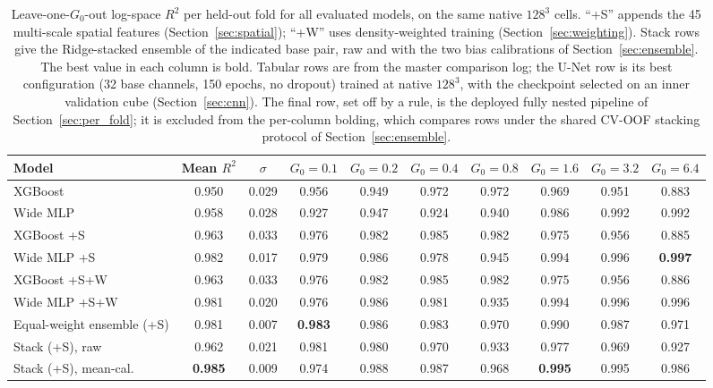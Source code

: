 \documentclass[fleqn,usenatbib]{rasti}
\newcommand{\Gzero}{G_0}
\newcommand{\Rsq}{R^2}
\begin{document}
\begin{table}
\centering
\caption{Leave-one-\(\Gzero\)-out log-space \(\Rsq\) per held-out fold for
all evaluated models, on the same native \(128^3\) cells. ``+S'' appends
the 45 multi-scale spatial features (Section~\ref{sec:spatial}); ``+W''
uses density-weighted training (Section~\ref{sec:weighting}). Stack
rows give the Ridge-stacked ensemble of the indicated base pair, raw and
with the two bias calibrations of Section~\ref{sec:ensemble}. The
best value in each column is bold. Tabular rows are from the master
comparison log; the U-Net row is its best configuration (32 base
channels, 150 epochs, no dropout) trained at native \(128^3\), with the
checkpoint selected on an inner validation cube
(Section~\ref{sec:cnn}). The final
row, set off by a rule, is the deployed fully nested pipeline of
Section~\ref{sec:per_fold}; it is excluded from the per-column
bolding, which compares rows under the shared CV-OOF stacking protocol
of Section~\ref{sec:ensemble}.}
\label{tab:main}
\begin{tabular}{lccccccccc}
\hline
Model & Mean \(\Rsq\) & \(\sigma\) &
  \(\Gzero{=}0.1\) & \(\Gzero{=}0.2\) & \(\Gzero{=}0.4\) &
  \(\Gzero{=}0.8\) & \(\Gzero{=}1.6\) & \(\Gzero{=}3.2\) & \(\Gzero{=}6.4\) \\
\hline
XGBoost                    & 0.950 & 0.029 & 0.956 & 0.949 & 0.972 & 0.972 & 0.969 & 0.951 & 0.883 \\
Wide MLP                   & 0.958 & 0.028 & 0.927 & 0.947 & 0.924 & 0.940 & 0.986 & 0.992 & 0.992 \\
XGBoost +S                 & 0.963 & 0.033 & 0.976 & 0.982 & 0.985 & 0.982 & 0.975 & 0.956 & 0.885 \\
Wide MLP +S                & 0.982 & 0.017 & 0.979 & 0.986 & 0.978 & 0.945 & 0.994 & 0.996 & \textbf{0.997} \\
XGBoost +S+W               & 0.963 & 0.033 & 0.976 & 0.982 & 0.985 & 0.982 & 0.975 & 0.956 & 0.886 \\
Wide MLP +S+W              & 0.981 & 0.020 & 0.976 & 0.986 & 0.981 & 0.935 & 0.994 & 0.996 & 0.996 \\
Equal-weight ensemble (+S) & 0.981 & 0.007 & \textbf{0.983} & 0.986 & 0.983 & 0.970 & 0.990 & 0.987 & 0.971 \\
Stack (+S), raw            & 0.962 & 0.021 & 0.981 & 0.980 & 0.970 & 0.933 & 0.977 & 0.969 & 0.927 \\
Stack (+S), mean-cal.      & \textbf{0.985} & 0.009 & 0.974 & 0.988 & 0.987 & 0.968 & \textbf{0.995} & 0.995 & 0.986 \\

\end{tabular}
\end{table}
\end{document}
